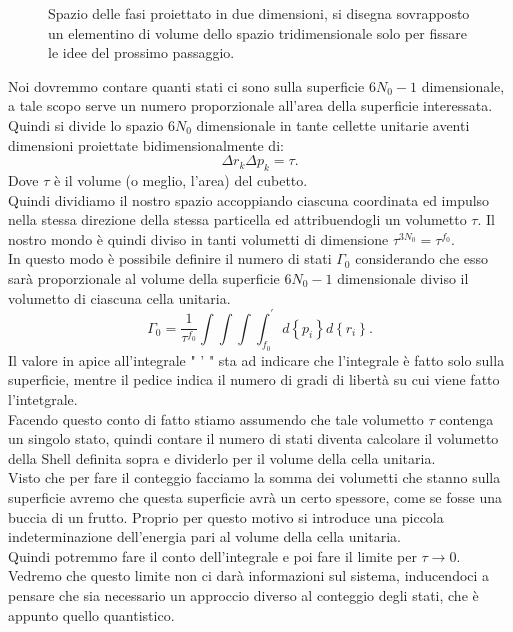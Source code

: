 \begin{figure}[H]
    \centering
    \caption{\scriptsize Spazio delle fasi proiettato in due dimensioni, si disegna sovrapposto un elementino di volume dello spazio tridimensionale solo per fissare le idee del prossimo passaggio.}
    \label{fig:spazio-delle-fasi-proiettato-in-due-dimensioni}
\end{figure}
\noindent
Noi dovremmo contare quanti stati ci sono sulla superficie $6N_0-1$ dimensionale, a tale scopo serve un numero proporzionale all'area della superficie interessata. \\
Quindi si divide lo spazio $6N_0$ dimensionale in tante cellette unitarie aventi dimensioni proiettate bidimensionalmente di: 
\[
\Delta r_{k} \Delta p_{k} = \tau
.\]
Dove $\tau$ è il volume (o meglio, l'area) del cubetto.\\
Quindi dividiamo il nostro spazio accoppiando ciascuna coordinata ed impulso nella stessa direzione della stessa particella ed attribuendogli un volumetto $\tau$. Il nostro mondo è quindi diviso in tanti volumetti di dimensione $\tau^{3N_0} = \tau^{f_0}$.\\
In questo modo è possibile definire il numero di stati $\Gamma_0$ considerando che esso sarà proporzionale al volume della superficie $6N_0-1$ dimensionale diviso il volumetto di ciascuna cella unitaria.
\[
	\Gamma_0 = \frac{1}{\tau^{f_0}} \int\int\int\int_{f_0}^{'}d\left\{ p_{i} \right\} d\left\{ r_{i} \right\} 
.\] 
Il valore in apice all'integrale " ' " sta ad indicare che l'integrale è fatto solo sulla superficie, mentre il pedice indica il numero di gradi di libertà su cui viene fatto l'intetgrale.\\
Facendo questo conto di fatto stiamo assumendo che tale volumetto $\tau$ contenga un singolo stato, quindi contare il numero di stati diventa calcolare il volumetto della Shell definita sopra e dividerlo per il volume della cella unitaria.\\
Visto che per fare il conteggio facciamo la somma dei volumetti che stanno sulla superficie avremo che questa superficie avrà un certo spessore, come se fosse una buccia di un frutto. Proprio per questo motivo si introduce una piccola indeterminazione dell'energia pari al volume della cella unitaria.\\
Quindi potremmo fare il conto dell'integrale e poi fare il limite per $\tau \rightarrow 0$. Vedremo che questo limite non ci darà informazioni sul sistema, inducendoci a pensare che sia necessario un approccio diverso al conteggio degli stati, che è appunto quello quantistico.\\
